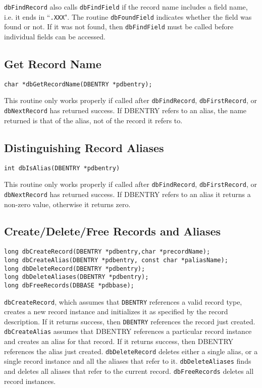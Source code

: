 \verb|dbFindRecord| also calls \verb|dbFindField| if the record name includes a field name, i.e. it ends in ``\verb|.XXX|".
The routine \verb|dbFoundField| indicates whether the field was found or not.
If it was not found, then \verb|dbFindField| must be called before individual fields can be accessed.

\subsection{Get Record Name}

\begin{verbatim}
char *dbGetRecordName(DBENTRY *pdbentry);
\end{verbatim}

This routine only works properly if called after \verb|dbFindRecord|, \verb|dbFirstRecord|, or \verb|dbNextRecord| has returned success.
If DBENTRY refers to an alias, the name returned is that of the alias, not of the record it refers to.

\subsection{Distinguishing Record Aliases}

\begin{verbatim}
int dbIsAlias(DBENTRY *pdbentry)
\end{verbatim}

This routine only works properly if called after \verb|dbFindRecord|, \verb|dbFirstRecord|, or \verb|dbNextRecord| has returned success.
If DBENTRY refers to an alias it returns a non-zero value, otherwise it returns zero.

\subsection{Create/Delete/Free Records and Aliases}

\begin{verbatim}
long dbCreateRecord(DBENTRY *pdbentry,char *precordName);
long dbCreateAlias(DBENTRY *pdbentry, const char *paliasName);
long dbDeleteRecord(DBENTRY *pdbentry);
long dbDeleteAliases(DBENTRY *pdbentry);
long dbFreeRecords(DBBASE *pdbbase);
\end{verbatim}

\verb|dbCreateRecord|, which assumes that \verb|DBENTRY| references a valid record type, creates a new record instance and 
initializes it as specified by the record description.
If it returns success, then \verb|DBENTRY| references the record just created.
\verb|dbCreateAlias| assumes that DBENTRY references a particular record instance and creates an alias for that record.
If it returns success, then DBENTRY references the alias just created.
\verb|dbDeleteRecord| deletes either a single alias, or a single record instance and all the aliases that refer to it. \verb|dbDeleteAliases| finds and deletes all aliases that refer to the current record.
\verb|dbFreeRecords| deletes all record instances.

